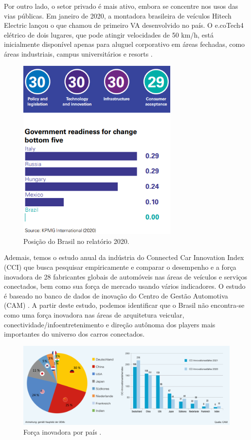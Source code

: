 Por outro lado, o setor privado é mais ativo, embora se concentre nos usos das vias públicas. Em janeiro de 2020, a montadora brasileira de veículos Hitech Electric lançou o que chamou de primeiro VA desenvolvido no país. O e.coTech4 elétrico de dois lugares, que pode atingir velocidades de 50 km/h, está inicialmente disponível apenas para aluguel corporativo em áreas fechadas, como áreas industriais, campus universitários e resorts \cite{KPMG}.

\begin{figure}[H]
\centering
\includegraphics[width=8cm]{Figures/rank30.png}
\caption{Posição do Brasil no relatório \cite{KPMG} 2020.}
\label{rank30}
\end{figure}

Ademais, temos o estudo anual da indústria do Connected Car Innovation Index (CCI) que busca pesquisar empiricamente e comparar o desempenho e a força inovadora de 28 fabricantes globais de automóveis nas áreas de veículos e serviços conectados, bem como sua força de mercado usando vários indicadores. O estudo é baseado no banco de dados de inovação do Centro de Gestão Automotiva (CAM) \cite{CCI}. A partir deste estudo, podemos identificar que o Brasil não encontra-se como uma força inovadora nas áreas de arquitetura veicular, conectividade/infoentretenimento e direção autônoma dos players mais importantes do universo dos carros conectados.


\begin{figure}[H]
\centering
\includegraphics[width=\textwidth]{Figures/CCI.jpg}
\caption{Força inovadora por país  \cite{CCI}.}
\label{forcaCCI}
\end{figure}


